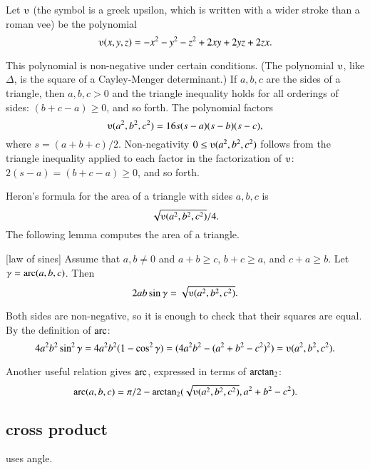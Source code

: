 \begin{definition}[$\ups$]\label{def:ups}
Let $\ups$ (the symbol is a greek upsilon, which is written with a
wider stroke than a roman vee) be the polynomial
    $$\ups(x,y,z) = -x^2 - y^2 - z^2 + 2 x y + 2 y z + 2 z x.$$
%
\end{definition}



This polynomial is non-negative under certain conditions. (The polynomial
$\ups$, like $\Delta$, 
is the square of a Cayley-Menger determinant.)  
If $a,b,c$ are the sides of a triangle, then $a,b,c>0$ and the triangle
inequality holds for all orderings of sides: $(b+c-a)\ge 0$, and so forth.
The polynomial factors
    $$\ups(a^2,b^2,c^2) = 16 s (s-a) (s-b) (s-c),$$
where $s = (a+b+c)/2$.
Non-negativity $0\le
\ups(a^2,b^2,c^2)$ follows from the triangle inequality applied to
each factor in the factorization of $\ups$: $2(s-a) = (b+c-a) \ge0$, and
so forth.  
%
%


Heron's formula for the area of 
a triangle with sides $a,b,c$ is $$\sqrt{\ups(a^2,b^2,c^2)}/4.$$  
%
The following
lemma  computes the area of a triangle.  

\begin{lemma}[law of sines]
Assume that $a,b\ne 0$ and $a+b\ge c$, $b+c\ge a$, and $c+a\ge b$.
Let $\gamma=\operatorname{arc}(a,b,c)$.  Then
        $$2 a b \sin\gamma = \sqrt{\ups(a^2,b^2,c^2)}.$$
\end{lemma}
%
%
%
\begin{proved}
Both sides are non-negative, so it is enough to check
that their squares are equal.  By the definition of $\operatorname{arc}$:
      $$4 a^2 b^2 \sin^2\gamma = 4 a^2 b^2 (1-\cos^2\gamma) = (4 a^2 b^2 - (a^2 + b^2 -
      c^2)^2) = \ups(a^2,b^2,c^2).$$
\swallowed\end{proved}

Another useful relation gives $\operatorname{arc}$, expressed in terms of ${\operatorname{arctan_2}}$:
  $$
  \arc(a,b,c) = 
    \pi/2 - \atn({\sqrt{\ups(a^2,b^2,c^2)}},{ a^2 + b^2 - c^2}).
    $$



\subsection{cross product} uses angle.

